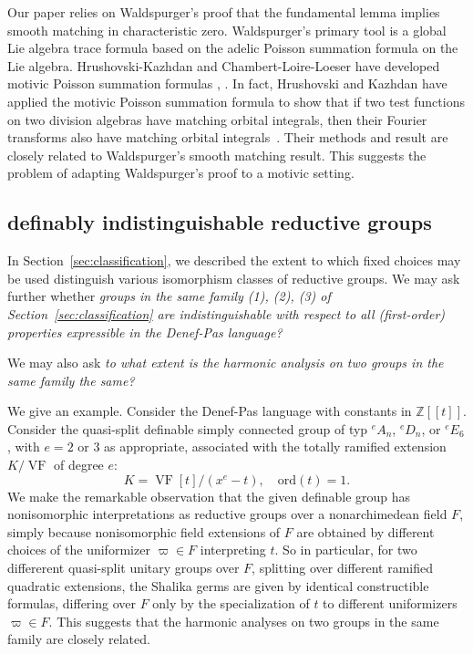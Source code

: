 \documentclass[12pt]{amsart}
\newcommand{\op}[1]{\operatorname{#1}}
\newcommand{\ring}[1]{{\mathbb #1}}
\def\VF{{\op{VF}}}
\newcommand\ord{\mathrm{ord}}
\theoremstyle{plain}
\theoremstyle{definition}
\begin{document}
Our paper relies on Waldspurger's proof that the fundamental lemma
implies smooth matching in characteristic zero.  Waldspurger's primary
tool is a global Lie algebra trace formula based on the adelic Poisson
summation formula on the Lie algebra.  Hrushovski-Kazhdan and
Chambert-Loire-Loeser have developed motivic Poisson summation
formulas \cite{hru-kazhdan}, \cite{loeser-cl}.  In fact, Hrushovski
and Kazhdan have applied the motivic Poisson summation formula to show
that if two test functions on two division algebras have matching
orbital integrals, then their Fourier transforms also have matching
orbital integrals~\cite[Theorem 1.1]{hru-kazhdan}.  Their methods and
result are closely related to Waldspurger's smooth matching result.
This suggests the problem of adapting Waldspurger's proof to a motivic
setting.

\subsection{definably indistinguishable reductive groups}

In Section~\ref{sec:classification}, we described the extent to which fixed choices
may be used distinguish various isomorphism classes of reductive
groups.  We may ask further whether {\it groups in the same family
  (1), (2), (3) of Section~\ref{sec:classification} are indistinguishable with respect
  to all (first-order) properties expressible in the Denef-Pas
  language?}

We may also ask {\it to what extent is the harmonic analysis on two groups
in the same family the same?}

We give an example.  Consider the Denef-Pas language with constants in
$\ring{Z}[[t]]$.  Consider the quasi-split definable simply connected group of
typ ${}^eA_n$, ${}^eD_n$, or ${}^eE_6$, with $e=2$ or $3$ as
appropriate, associated with the totally ramified extension $K/\VF$ of
degree $e$:
\[
K = \VF[t]/(x^e - t),\quad \ord (t) = 1.
\]
We make the remarkable observation that the given definable group has
nonisomorphic interpretations as reductive groups over a
nonarchimedean field $F$, simply because nonisomorphic field
extensions of $F$ are obtained by different choices of the uniformizer
$\varpi\in F$ interpreting $t$.  So in particular, for two differerent
quasi-split unitary groups over $F$, splitting over different ramified
quadratic extensions, the Shalika germs are given by identical
constructible formulas, differing over $F$ only by the specialization
of $t$ to different uniformizers $\varpi\in F$.  This suggests that
the harmonic analyses on two groups in the same family are closely
related.
\end{document}
